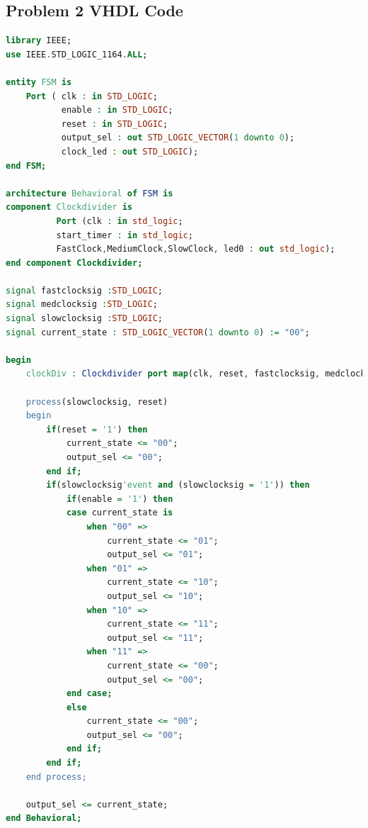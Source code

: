 \documentclass[11pt]{article}
\begin{document}
\begin{appendices}
\section{Problem 2 VHDL Code}
\begin{lstlisting}[language=VHDL]
library IEEE;
use IEEE.STD_LOGIC_1164.ALL;

entity FSM is
    Port ( clk : in STD_LOGIC;
           enable : in STD_LOGIC;
           reset : in STD_LOGIC;
           output_sel : out STD_LOGIC_VECTOR(1 downto 0);
           clock_led : out STD_LOGIC);
end FSM;

architecture Behavioral of FSM is
component Clockdivider is 
          Port (clk : in std_logic;
          start_timer : in std_logic;
	      FastClock,MediumClock,SlowClock, led0 : out std_logic);
end component Clockdivider;

signal fastclocksig :STD_LOGIC;
signal medclocksig :STD_LOGIC;
signal slowclocksig :STD_LOGIC;
signal current_state : STD_LOGIC_VECTOR(1 downto 0) := "00";

begin
    clockDiv : Clockdivider port map(clk, reset, fastclocksig, medclocksig, slowclocksig, clock_led);
    
    process(slowclocksig, reset)
    begin
        if(reset = '1') then
            current_state <= "00";
            output_sel <= "00";
        end if;
        if(slowclocksig'event and (slowclocksig = '1')) then
            if(enable = '1') then
            case current_state is
                when "00" =>
                    current_state <= "01";
                    output_sel <= "01";
                when "01" =>
                    current_state <= "10";
                    output_sel <= "10";
                when "10" =>
                    current_state <= "11";
                    output_sel <= "11";
                when "11" =>
                    current_state <= "00";
                    output_sel <= "00";
            end case;
            else
                current_state <= "00";
                output_sel <= "00";
            end if;
        end if;
    end process;
    
    output_sel <= current_state;
end Behavioral;
\end{lstlisting}


\end{appendices}
\end{document}
